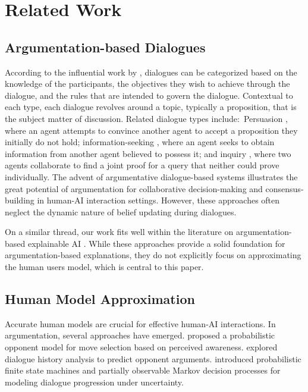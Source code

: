 \section{Related Work}
\subsection{Argumentation-based Dialogues}

According to the influential work by \citet{walton1995commitment}, dialogues can be categorized based on the knowledge of the participants, the objectives they wish to achieve through the dialogue, and the rules that are intended to govern the dialogue. Contextual to each type, each dialogue revolves around a topic, typically a proposition, that is the subject matter of discussion. Related dialogue types include:~Persuasion \citep{gordon1994,prakken2006formal}, where an agent attempts to convince another agent to accept a proposition they initially do not hold; information-seeking \citep{parsons2003properties,fan2012agent}, where an agent seeks to obtain information from another agent believed to possess it; and inquiry \citep{hitchcock2017some,black2009inquiry}, where two agents collaborate to find a joint proof for a query that neither could prove individually. The advent of argumentative dialogue-based systems \cite{black2021argumentation} illustrates the great potential of argumentation for collaborative decision-making and consensus-building in human-AI interaction settings. However, these approaches often neglect the dynamic nature of belief updating during dialogues.
 
On a similar thread, our work fits well within the literature on argumentation-based explainable AI \cite{fan2015computing,shams2016normative,fan2018on,collins2019towards,budan2020proximity,dennis2022explaining,Rago_23,vasileiou_DR}. While these approaches provide a solid foundation for argumentation-based explanations, they do not explicitly focus on approximating the human users model, which is central to this paper. 

\subsection{Human Model Approximation}

Accurate human models are crucial for effective human-AI interactions. In argumentation, several approaches have emerged. \citet{rienstra2013opponent} proposed a probabilistic opponent model for move selection based on perceived awareness. \citet{hadjinikolis2013opponent} explored dialogue history analysis to predict opponent arguments. \citet{hadoux2015optimization} introduced probabilistic finite state machines and partially observable Markov decision processes for modeling dialogue progression under uncertainty.

